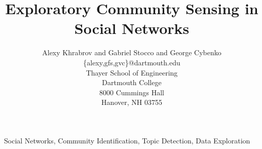 \documentclass[article]{spie}
\begin{document}
\title{Exploratory Community Sensing in Social Networks}
	
\author{Alexy Khrabrov and Gabriel Stocco and George Cybenko
\skiplinehalf
{\{alexy,gfs,gvc\}}@dartmouth.edu\\
Thayer School of Engineering\\
Dartmouth College\\
8000 Cummings Hall\\
Hanover, NH 03755}

\maketitle 

\begin{keywords}
 {}Social Networks, Community Identification, Topic Detection, Data Exploration
\end{keywords}













\end{document}
